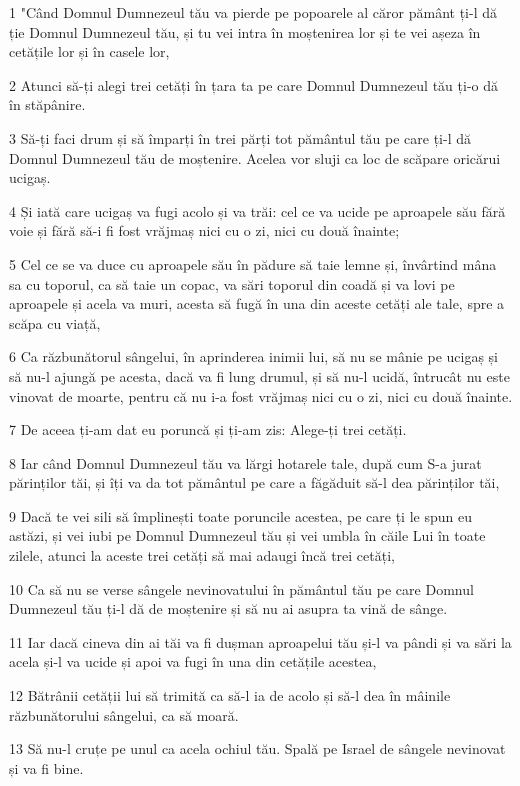 \par 1 "Când Domnul Dumnezeul tău va pierde pe popoarele al căror pământ ți-l dă ție Domnul Dumnezeul tău, și tu vei intra în moștenirea lor și te vei așeza în cetățile lor și în casele lor,
\par 2 Atunci să-ți alegi trei cetăți în țara ta pe care Domnul Dumnezeul tău ți-o dă în stăpânire.
\par 3 Să-ți faci drum și să împarți în trei părți tot pământul tău pe care ți-l dă Domnul Dumnezeul tău de moștenire. Acelea vor sluji ca loc de scăpare oricărui ucigaș.
\par 4 Și iată care ucigaș va fugi acolo și va trăi: cel ce va ucide pe aproapele său fără voie și fără să-i fi fost vrăjmaș nici cu o zi, nici cu două înainte;
\par 5 Cel ce se va duce cu aproapele său în pădure să taie lemne și, învârtind mâna sa cu toporul, ca să taie un copac, va sări toporul din coadă și va lovi pe aproapele și acela va muri, acesta să fugă în una din aceste cetăți ale tale, spre a scăpa cu viață,
\par 6 Ca răzbunătorul sângelui, în aprinderea inimii lui, să nu se mânie pe ucigaș și să nu-l ajungă pe acesta, dacă va fi lung drumul, și să nu-l ucidă, întrucât nu este vinovat de moarte, pentru că nu i-a fost vrăjmaș nici cu o zi, nici cu două înainte.
\par 7 De aceea ți-am dat eu poruncă și ți-am zis: Alege-ți trei cetăți.
\par 8 Iar când Domnul Dumnezeul tău va lărgi hotarele tale, după cum S-a jurat părinților tăi, și îți va da tot pământul pe care a făgăduit să-l dea părinților tăi,
\par 9 Dacă te vei sili să împlinești toate poruncile acestea, pe care ți le spun eu astăzi, și vei iubi pe Domnul Dumnezeul tău și vei umbla în căile Lui în toate zilele, atunci la aceste trei cetăți să mai adaugi încă trei cetăți,
\par 10 Ca să nu se verse sângele nevinovatului în pământul tău pe care Domnul Dumnezeul tău ți-l dă de moștenire și să nu ai asupra ta vină de sânge.
\par 11 Iar dacă cineva din ai tăi va fi dușman aproapelui tău și-l va pândi și va sări la acela și-l va ucide și apoi va fugi în una din cetățile acestea,
\par 12 Bătrânii cetății lui să trimită ca să-l ia de acolo și să-l dea în mâinile răzbunătorului sângelui, ca să moară.
\par 13 Să nu-l cruțe pe unul ca acela ochiul tău. Spală pe Israel de sângele nevinovat și va fi bine.
